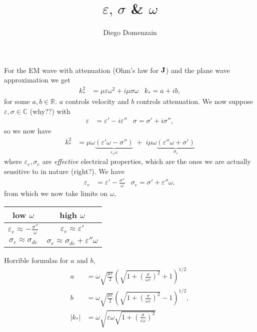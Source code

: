 \documentclass[a4paper,12pt]{article}
\title{$\varepsilon,\, \sigma$ \& $\omega$}
\author{Diego Domenzain}
\date{}
\begin{document}
 \maketitle
For the EM wave with attenuation (Ohm's law for ${\bf J}$) and the plane wave approximation we get
\begin{align*}
 k_{*}^{2} &= \mu\varepsilon\omega^2 + i\mu\sigma\omega & k_{*} = a+ib,
\end{align*}
for some $a,b\in\mathbb{R}$. $a$ controls velocity and $b$ controls attenuation. We now suppose $\varepsilon,\sigma\in\mathbb{C}$ (\color{red}why??\color{black}) with
\begin{align*}
 \varepsilon &= \varepsilon' - i\varepsilon'' & \sigma = \sigma' + i\sigma'',
\end{align*}
so we now have
\begin{align*}
 k_{*}^{2} &= \mu\omega\underbrace{(\varepsilon'\omega - \sigma'')}_{\varepsilon_e\omega} \; + \;
i\mu\omega\underbrace{(\varepsilon''\omega + \sigma')}_{\sigma_e}
\end{align*}
where $\varepsilon_e,\sigma_e$ are {\it effective} electrical properties, which are the ones we 
are actually sensitive to in nature (\color{red}right?\color{black}). We have
\begin{align*}
\varepsilon_e &= \varepsilon' - \frac{\sigma''}{\omega} &
\sigma_e=\sigma' + \varepsilon''\omega,
\end{align*}
from which we now take limits on $\omega$,
\begin{center}
\begin{tabular}{c | c}
 low $\omega$ & high $\omega$ \\
\hline
$\varepsilon_e\approx -\frac{\sigma''}{\omega}$ & \hspace{-3.5em}$\varepsilon_e\approx\varepsilon'$ \\
\hspace{-0.6em}$\sigma_e\approx\sigma_{dc}$ & $\sigma_e\approx\sigma_{dc}+\varepsilon''\omega$
\end{tabular}
\end{center}
Horrible formulas for $a$ and $b$,
\begin{align*}
a &= \omega\sqrt{\frac{\mu\varepsilon}{2}}
\left( \sqrt{1 + \left( \frac{\sigma}{\omega\varepsilon} \right)^{2}} + 1 \right)^{1/2}  \\
b &= \omega\sqrt{\frac{\mu\varepsilon}{2}}
\left( \sqrt{1 + \left( \frac{\sigma}{\omega\varepsilon} \right)^{2}} - 1 \right)^{1/2},\\
|k_*| &= 
\omega\sqrt{\varepsilon\omega\sqrt{1+\left(\frac{\sigma}{\varepsilon\omega}\right)^2}}
\end{align*}
\end{document}
